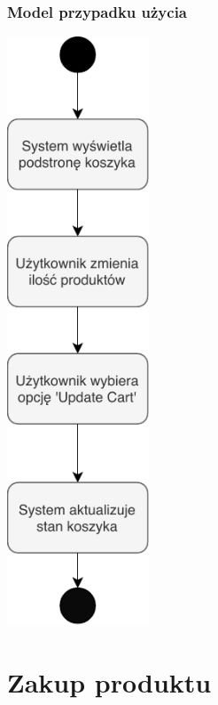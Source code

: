 \documentclass[12pt]{report}
\begin{document}
\subsubsection{Model przypadku użycia}
\begin{center}
	\includegraphics[width=120pt]{koszyk2.pdf}
\end{center}
	
	\section{Zakup produktu}
	
\end{document}
